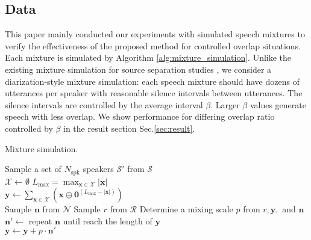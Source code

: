 \documentclass[a4paper]{article}
\begin{document}
\subsection{Data}
\label{sec:data}

This paper mainly conducted our experiments with simulated speech mixtures to verify the effectiveness of the proposed method for controlled overlap situations.
Each mixture is simulated by Algorithm \ref{alg:mixture_simulation}.
Unlike the existing mixture simulation for source separation studies \cite{Hershey2016}, we consider a diarization-style mixture simulation: each speech mixture should have dozens of utterances per speaker with reasonable silence intervals between utterances.
The silence intervals are controlled by the average interval $\beta$. Larger $\beta$ values generate speech with less overlap. 
We show performance for differing overlap ratio controlled by $\beta$ in the result section Sec.\ref{sec:result}.

\begin{algorithm}[t]
	\SetAlgoLined
	\DontPrintSemicolon
	\caption{Mixture simulation.}
	\label{alg:mixture_simulation}
	\SetAlgoVlined
	\BlankLine
	Sample a set of $N_\text{spk}$ speakers $\mathcal{S'}$ from $\mathcal{S}$\\
		$\mathcal{X}\leftarrow\emptyset$
		$L_\mathrm{max}=\max_{\mathbf{x}\in\mathcal{X}}\lvert\mathbf{x}\rvert$\\
		$\mathbf{y}\leftarrow\sum_{\mathbf{x}\in\mathcal{X}}\left(\mathbf{x}\oplus\mathbf{0}^{\left(L_\mathrm{max}-\lvert\mathbf{x}\rvert\right)}\right)$\\
		Sample $\mathbf{n}$ from $\mathcal{N}$
		Sample $r$ from $\mathcal{R}$
		Determine a mixing scale $p$ from $r,\mathbf{y},$ and $\mathbf{n}$\\
		$\mathbf{n}'\leftarrow$ repeat $\mathbf{n}$ until reach the length of $\mathbf{y}$\\
		$\mathbf{y}\leftarrow\mathbf{y}+p\cdot\mathbf{n}'$\\
\end{algorithm}
\end{document}
